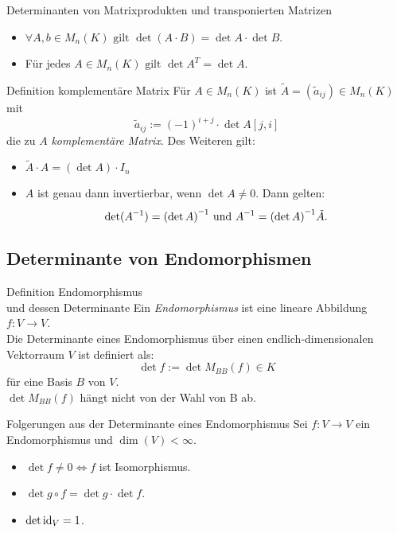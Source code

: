 \documentclass[main.tex]{subfiles}
\begin{document}
\begin{karte}{Determinanten von Matrixprodukten und transponierten Matrizen}
    \begin{itemize}
        \item \(\forall A,b \in M_n(K) \text{ gilt } 
        \det(A \cdot B) = \det A \cdot \det B\).
        \item Für jedes \(A \in M_n(K) \text{ gilt } 
        \det A^T = \det A\).
    \end{itemize}
\end{karte}
\begin{karte}{Definition komplementäre Matrix}
    Für \(A \in M_n(K)\) ist \(\tilde{A} = (\tilde{a}_{ij}) \in M_n(K)\) mit
    \[\tilde{a}_{ij} := {(-1)}^{i+j} \cdot \det A[j,i]\]
    die zu \(A\) \textit{komplementäre Matrix}.
    Des Weiteren gilt:
    \begin{itemize}
        \item \(\tilde{A} \cdot A = (\det A) \cdot I_n\)
        \item \(A\) ist genau dann invertierbar, wenn \(\det A \neq 0\). Dann gelten: 
        \[\det(\inverse A) = \inverse{(\det A)} \text{ und }
         \inverse A = \inverse{(\det A)} \tilde{A}.\]
    \end{itemize}
\end{karte}

\subsection*{Determinante von Endomorphismen}

\begin{karte}{Definition Endomorphismus\\und dessen Determinante}
    Ein \textit{Endomorphismus} ist eine lineare Abbildung 
    \( f: V \rightarrow V \).\\
    Die Determinante eines Endomorphismus über einen endlich-dimensionalen 
    Vektorraum \(V\) ist definiert als:
    \[ \det f := \det M_{BB}(f) \in K \]
    für eine Basis \(B\) von \(V\).\\
    \(\det M_{BB}(f)\) hängt nicht von der Wahl von B ab. 
\end{karte}
\begin{karte}{Folgerungen aus der Determinante eines Endomorphismus}
    Sei \(f: V \rightarrow V\) ein Endomorphismus und \(\dim(V) < \infty\).
    \begin{itemize}
        \item \(\det f \neq 0 \Leftrightarrow f\) ist Isomorphismus.
        \item \(\det g \circ f = \det g \cdot \det f\).
        \item \(\det \operatorname{id}_V = 1\).
    \end{itemize}
\end{karte}
\end{document}
